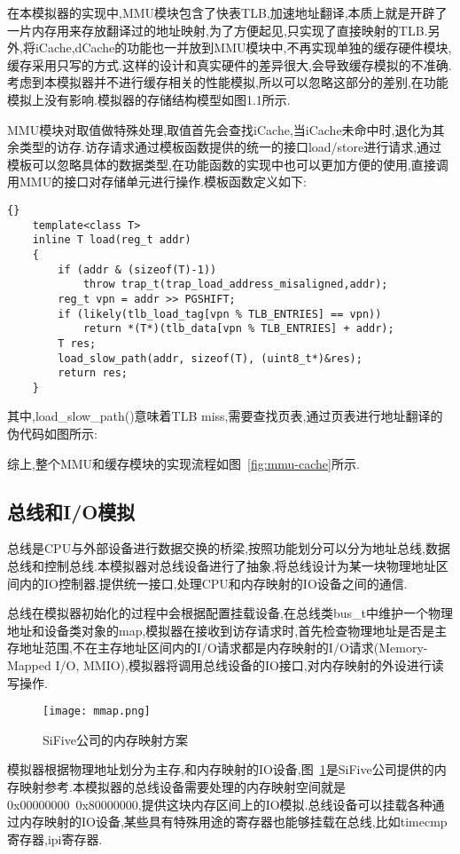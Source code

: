 在本模拟器的实现中,MMU模块包含了快表TLB,加速地址翻译,本质上就是开辟了一片内存用来存放翻译过的地址映射,为了方便起见,只实现了直接映射的TLB.另外,将iCache,dCache的功能也一并放到MMU模块中,不再实现单独的缓存硬件模块,缓存采用只写的方式.这样的设计和真实硬件的差异很大,会导致缓存模拟的不准确.考虑到本模拟器并不进行缓存相关的性能模拟,所以可以忽略这部分的差别,在功能模拟上没有影响.模拟器的存储结构模型如图1.1所示.


MMU模块对取值做特殊处理,取值首先会查找iCache,当iCache未命中时,退化为其余类型的访存.访存请求通过模板函数提供的统一的接口load/store进行请求,通过模板可以忽略具体的数据类型,在功能函数的实现中也可以更加方便的使用,直接调用MMU的接口对存储单元进行操作.模板函数定义如下:
\begin{lstlisting}{}
    template<class T>
    inline T load(reg_t addr)
    {
        if (addr & (sizeof(T)-1))
            throw trap_t(trap_load_address_misaligned,addr);
        reg_t vpn = addr >> PGSHIFT;
        if (likely(tlb_load_tag[vpn % TLB_ENTRIES] == vpn))
            return *(T*)(tlb_data[vpn % TLB_ENTRIES] + addr);
        T res;
        load_slow_path(addr, sizeof(T), (uint8_t*)&res);
        return res;
    }    
\end{lstlisting}


其中,load\_slow\_path()意味着TLB miss,需要查找页表,通过页表进行地址翻译的伪代码如图所示:


综上,整个MMU和缓存模块的实现流程如图~\ref{fig:mmu-cache}所示.


\subsection{总线和I/O模拟}
总线是CPU与外部设备进行数据交换的桥梁,按照功能划分可以分为地址总线,数据总线和控制总线.本模拟器对总线设备进行了抽象,将总线设计为某一块物理地址区间内的IO控制器,提供统一接口,处理CPU和内存映射的IO设备之间的通信.


总线在模拟器初始化的过程中会根据配置挂载设备,在总线类bus\_t中维护一个物理地址和设备类对象的map,模拟器在接收到访存请求时,首先检查物理地址是否是主存地址范围,不在主存地址区间内的I/O请求都是内存映射的I/O请求(Memory-Mapped I/O, MMIO),模拟器将调用总线设备的IO接口,对内存映射的外设进行读写操作.
\begin{figure}[H]
    \centering
    \texttt{[image: mmap.png]}
    \caption{SiFive公司的内存映射方案}
    \label{fig:mmap}
\end{figure}

模拟器根据物理地址划分为主存,和内存映射的IO设备,图~\ref{fig:mmap}是SiFive公司提供的内存映射参考.本模拟器的总线设备需要处理的内存映射空间就是0x00000000~0x80000000,提供这块内存区间上的IO模拟.总线设备可以挂载各种通过内存映射的IO设备,某些具有特殊用途的寄存器也能够挂载在总线,比如timecmp寄存器,ipi寄存器.


